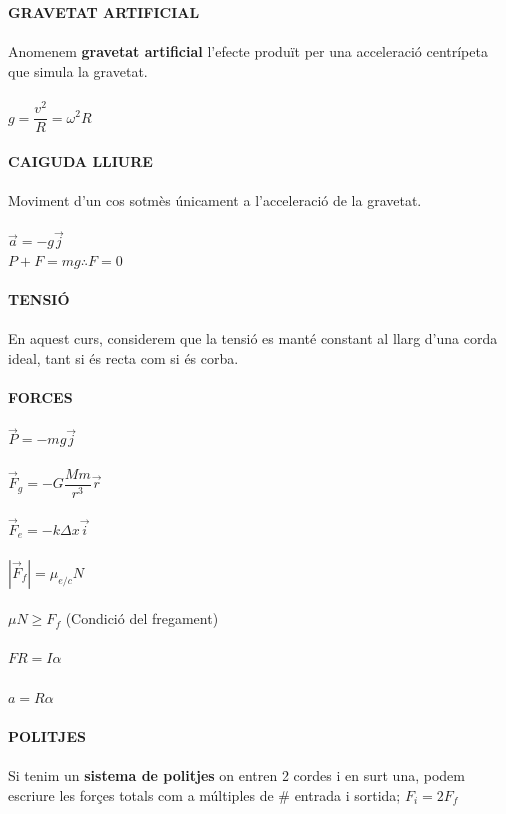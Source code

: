 \documentclass[11pt]{article}
\begin{document}
\begin{tcolorbox}[
    title=Fórmules Bàsiques,
    colback=RosyBrown!5!white,
    colframe=RosyBrown!70!black,
    coltitle=white,
    colbacktitle=RosyBrown!70!black,
    fonttitle=\bfseries,
    arc=6pt,
    boxrule=0.8pt
]

\textbf{GRAVETAT ARTIFICIAL}\\
\\
Anomenem \textbf{gravetat artificial} l'efecte produït per una acceleració centrípeta que simula la gravetat.\\
\\
$g = \dfrac{v^2}{R} = \omega^2 R$\\
\\
\textbf{CAIGUDA LLIURE}\\
\\
Moviment d'un cos sotmès únicament a l'acceleració de la gravetat.\\
\\
$\vec{a} = -g\vec{j}$\\
$P + F = mg \therefore F = 0$\\
\\
\textbf{TENSIÓ}\\
\\
En aquest curs, considerem que la tensió es manté constant al llarg d'una corda ideal, tant si és recta com si és corba.\\
\\
\textbf{FORCES}\\
\\
$\vec{P} = -mg\vec{j}$\\
\\
$\vec{F}_g = -G\dfrac{Mm}{r^3}\vec{r}$\\
\\
$\vec{F}_e = -k\Delta x\vec{i}$\\
\\
$\left|\vec{F}_f\right| = \mu_{e/c}N$\\
\\
$\mu N \geq F_f$ (Condició del fregament)\\
\\
$F R = I \alpha$\\
\\
$a = R \alpha$\\
\\
\textbf{POLITJES}\\
\\
Si tenim un \textbf{sistema de politjes} on entren 2 cordes i en surt una, podem escriure les forçes totals com a múltiples de \# entrada i sortida; $F_i = 2F_f$

\end{tcolorbox}
\end{document}
